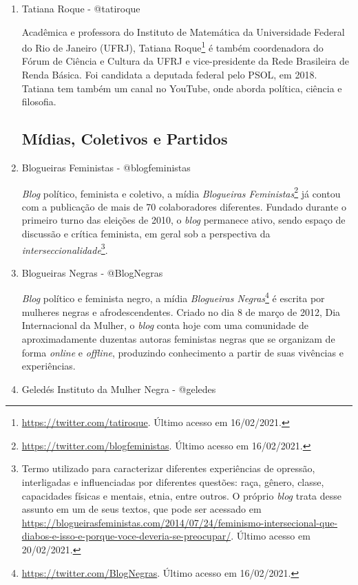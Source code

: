 \documentclass[
	12pt,				%
	openright,			%
	twoside,			%
	a4paper,			%
	english,			%
	brazil				%
	]{abntex2}
\begin{document}
\begin{anexosenv}
\begin{enumerate}
 \item Tatiana Roque - @tatiroque
 
 Acadêmica e professora do Instituto de Matemática da Universidade Federal do Rio de Janeiro (UFRJ), Tatiana Roque\footnote{\url{https://twitter.com/tatiroque}. Último acesso em 16/02/2021.} é também coordenadora do Fórum de Ciência e Cultura da UFRJ e vice-presidente da Rede Brasileira de Renda Básica. Foi candidata a deputada federal pelo PSOL, em 2018. Tatiana tem também um canal no YouTube, onde aborda política, ciência e filosofia.

 \subsection*{Mídias, Coletivos e Partidos}

 \item Blogueiras Feministas - @blogfeministas\label{blogfeministas}
 
 \textit{Blog} político, feminista e coletivo, a mídia \textit{Blogueiras Feministas}\footnote{\url{https://twitter.com/blogfeministas}. Último acesso em 16/02/2021.} já contou com a publicação de mais de 70 colaboradores diferentes. Fundado durante o primeiro turno das eleições de 2010, o \textit{blog} permanece ativo, sendo espaço de discussão e crítica feminista, em geral sob a perspectiva da \textit{interseccionalidade}\footnote{Termo utilizado para caracterizar diferentes experiências de opressão, interligadas e influenciadas por diferentes questões: raça, gênero, classe, capacidades físicas e mentais, etnia, entre outros. O próprio \textit{blog} trata desse assunto em um de seus textos, que pode ser acessado em \url{https://blogueirasfeministas.com/2014/07/24/feminismo-intersecional-que-diabos-e-isso-e-porque-voce-deveria-se-preocupar/}. Último acesso em 20/02/2021.}.
 
 \item Blogueiras Negras - @BlogNegras
 
 \textit{Blog} político e feminista negro, a mídia \textit{Blogueiras Negras}\footnote{\url{https://twitter.com/BlogNegras}. Último acesso em 16/02/2021.} é escrita por mulheres negras e afrodescendentes. Criado no dia 8 de março de 2012, Dia Internacional da Mulher, o \textit{blog} conta hoje com uma comunidade de aproximadamente duzentas autoras feministas negras que se organizam de forma \textit{online} e \textit{offline}, produzindo conhecimento a partir de suas vivências e experiências.

 \item Geledés Instituto da Mulher Negra - @geledes
 

\end{enumerate}
\end{anexosenv}
\end{document}
